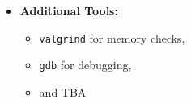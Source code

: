 \documentclass[11pt,a4paper]{report}
\theoremstyle{definitionstyle}
\begin{document}
\begin{itemize}
\begin{verbatim}
\end{verbatim}
	\item \textbf{Additional Tools:} 
	\begin{itemize}
		\item \texttt{valgrind} for memory checks, 
		\item \texttt{gdb} for debugging, 
		\item and TBA %
	\end{itemize}
%

\end{itemize}
%
%
%
%
%
\end{document}
